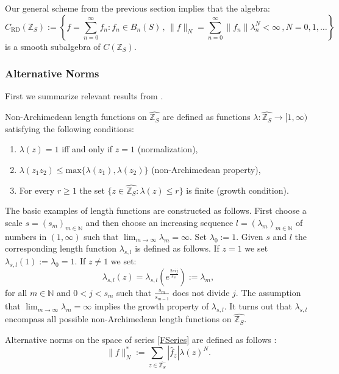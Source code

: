\documentclass[12pt,reqno]{amsart}
\numberwithin{equation}{section}
\newcommand{\N}{{\mathbb N}}
\newcommand{\Z}{{\mathbb Z}}
\begin{document}
Our general scheme from the previous section implies that the algebra:
\begin{equation*}
C_\textrm{RD}(\Z_S) := \left\{f=\sum_{n=0}^\infty f_n: f_n\in B_n(S)\,,\,\|f\|_N = \sum_{n=0}^\infty\|f_n\|\lambda_n^N<\infty\,,N=0,1,\ldots\right\}
\end{equation*}
is a smooth subalgebra of $C(\Z_S)$.

\subsubsection{Alternative Norms}
First we summarize relevant results from \cite{KM2}.

Non-Archimedean length functions on $\widehat{\Z_S}$ are defined as functions $\lambda: \widehat{\Z_S}\to [1,\infty)$ satisfying the following conditions:
\begin{enumerate}
\item $\lambda(z)=1$ iff and only if $z=1$ (normalization),
\item $\lambda(z_1z_2)\leq\text{max}\{\lambda(z_1), \lambda(z_2)\}$ (non-Archimedean property),
\item For every $r\geq 1$ the set $\{z\in\widehat{\Z_S}: \lambda(z)\leq r\}$ is finite (growth condition).
\end{enumerate}

The basic examples of length functions are constructed as follows. First choose a scale  $s = (s_m)_{m\in\N}$ and then choose an increasing sequence $l = (\lambda_m)_{m\in\N}$ of numbers in $(1,\infty)$ such that $\lim_{m\to\infty}\lambda_m=\infty$. Set $\lambda_0:=1$. Given $s$ and $l$ the corresponding length function $\lambda_{s,l}$ is defined as follows. If $z=1$ we set $\lambda_{s,l}(1):=\lambda_0=1$. If $z\ne 1$ we set:
\begin{equation*}
\lambda_{s,l}(z)=\lambda_{s,l}\left(e^{\frac{2\pi ij}{s_m}}\right):=\lambda_m,
\end{equation*}
for all $m\in \N$ and $0<j<s_m$ such that $\frac{s_m}{s_{m-1}}$ does not divide $j$. 
The assumption that $\lim_{m\to\infty}\lambda_m=\infty$ implies the growth property of $\lambda_{s,l}$.
It turns out that $\lambda_{s,l}$ encompass all possible non-Archimedean length functions on $\widehat{\Z_S}$.

Alternative norms on the space of series \eqref{FSeries} are defined as follows \cite{KM2}:
\begin{equation*}
\|f\|_N^*:=\sum_{z\in\widehat{\Z_S}}|\hat f_z|\lambda(z)^N.
\end{equation*}
\end{document}
